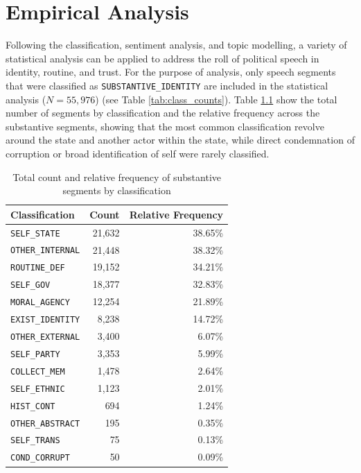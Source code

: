 \chapter{Empirical Analysis}
\label{chap:five}

Following the classification, sentiment analysis, and topic modelling, a variety of statistical analysis can be applied to address the roll of political speech in identity, routine, and trust. For the purpose of analysis, only speech segments that were classified as \texttt{SUBSTANTIVE\_IDENTITY} are included in the statistical analysis ($N=55,976$) (see Table \ref{tab:class_counts}). Table \ref{tab:class_count_identity} show the total number of segments by classification and the relative frequency across the substantive segments, showing that the most common classification revolve around the state and another actor within the state, while direct condemnation of corruption or broad identification of self were rarely classified. 

\begin{table}[htbp]
    \centering
    \caption{Total count and relative frequency of substantive segments by classification}
    \begin{tabular}{lrr}
    \toprule
    Classification & Count & Relative Frequency \\
    \midrule
    \texttt{SELF\_STATE} & 21,632 & 38.65\% \\
    \texttt{OTHER\_INTERNAL} & 21,448 & 38.32\% \\
    \texttt{ROUTINE\_DEF} & 19,152 & 34.21\% \\
    \texttt{SELF\_GOV} & 18,377 & 32.83\% \\
    \texttt{MORAL\_AGENCY} & 12,254 & 21.89\% \\
    \texttt{EXIST\_IDENTITY} & 8,238 & 14.72\% \\
    \texttt{OTHER\_EXTERNAL} & 3,400 & 6.07\% \\
    \texttt{SELF\_PARTY} & 3,353 & 5.99\% \\
    \texttt{COLLECT\_MEM} & 1,478 & 2.64\% \\
    \texttt{SELF\_ETHNIC} & 1,123 & 2.01\% \\
    \texttt{HIST\_CONT} & 694 & 1.24\% \\
    \texttt{OTHER\_ABSTRACT} & 195 & 0.35\% \\
    \texttt{SELF\_TRANS} & 75 & 0.13\% \\
    \texttt{COND\_CORRUPT} & 50 & 0.09\% \\
    \bottomrule
    \end{tabular}
    \label{tab:class_count_identity}

\end{table}

